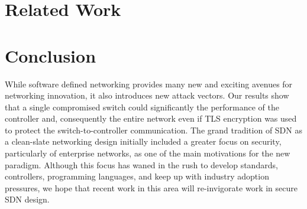 \documentclass[12pt, letterpaper, twocolumn, twoside]{article}
\begin{document}
\begin{spacing}{1.0}
\section{Related Work}
\label{related}


\section{Conclusion}
While software defined networking provides many new and exciting avenues for networking innovation, it also introduces new attack vectors. Our results show that a single compromised switch could significantly the performance of the controller and, consequently the entire network even if TLS encryption was used to protect the switch-to-controller communication. 
The grand tradition of SDN as a clean-slate networking design \cite{4d} \cite{ethane} \cite{sane} initially included a greater focus on security, particularly of enterprise networks, as one of the main motivations for the new paradigm.  Although this focus has waned in the rush to develop standards, controllers, programming languages, and keep up with industry adoption pressures, we hope that recent work in this area will re-invigorate work in secure SDN design.





\end{spacing}
\end{document}
